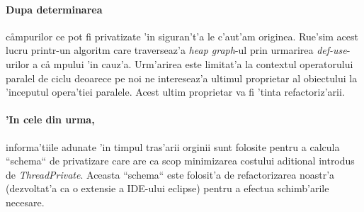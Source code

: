 \paragraph{Dupa determinarea} c\aa mpurilor ce pot fi privatizate 'in
siguran't'a le c'aut'am originea. Rue'sim acest lucru printr-un algoritm care
traverseaz'a \emph{heap graph}-ul prin urmarirea \emph{def-use}-urilor a c\aa
mpului 'in cauz'a. Urm'arirea este limitat'a la contextul operatorului paralel
de ciclu deoarece pe noi ne intereseaz'a ultimul proprietar al obiectului la
'inceputul opera'tiei paralele. Acest ultim proprietar va fi 'tinta
refactoriz'arii.

\paragraph{'In cele din urma,} informa'tiile adunate 'in timpul tras'arii
orginii sunt folosite pentru a calcula ``schema`` de privatizare care are ca
scop minimizarea costului aditional introdus de \emph{ThreadPrivate}. Aceasta
``schema`` este folosit'a de refactorizarea noastr'a (dezvoltat'a ca o extensie
a IDE-ului eclipse) pentru a efectua schimb'arile necesare.


